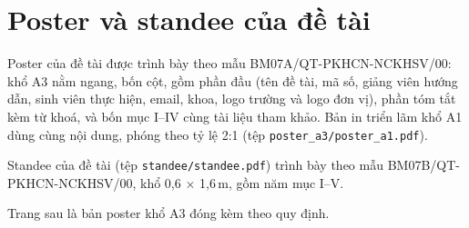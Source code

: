 \chapter{Poster và standee của đề tài}
\label{pl:e}

Poster của đề tài được trình bày theo mẫu BM07A/QT-PKHCN-NCKHSV/00: khổ A3 nằm ngang, bốn cột, gồm phần đầu (tên đề tài, mã số, giảng viên hướng dẫn, sinh viên thực hiện, email, khoa, logo trường và logo đơn vị), phần tóm tắt kèm từ khoá, và bốn mục I--IV cùng tài liệu tham khảo. Bản in triển lãm khổ A1 dùng cùng nội dung, phóng theo tỷ lệ 2:1 (tệp \texttt{poster\_a3/poster\_a1.pdf}).

Standee của đề tài (tệp \texttt{standee/standee.pdf}) trình bày theo mẫu BM07B/QT-PKHCN-NCKHSV/00, khổ 0,6 $\times$ 1,6\,m, gồm năm mục I--V.

Trang sau là bản poster khổ A3 đóng kèm theo quy định.
\clearpage
{}
